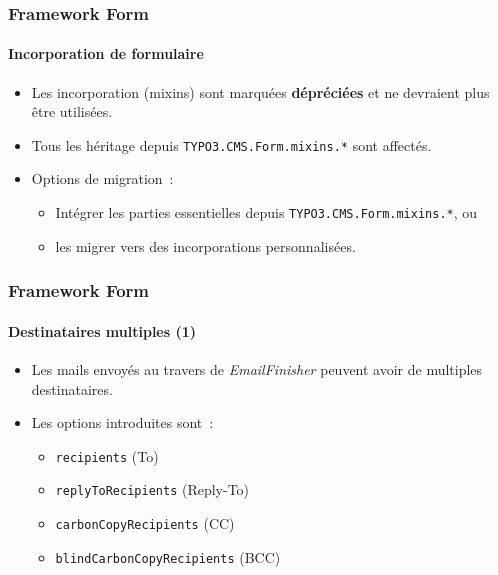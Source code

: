 
\begin{frame}[fragile]
	\frametitle{Framework Form}
	\framesubtitle{Incorporation de formulaire}

	\begin{itemize}
		\item Les incorporation (mixins) sont marquées \textbf{dépréciées} et ne devraient plus être utilisées.
		\item Tous les héritage depuis \texttt{TYPO3.CMS.Form.mixins.*} sont affectés.
		\item Options de migration~:

			\begin{itemize}
				\item Intégrer les parties essentielles depuis \texttt{TYPO3.CMS.Form.mixins.*}, ou
				\item les migrer vers des incorporations personnalisées.
			\end{itemize}

	\end{itemize}

\end{frame}


\begin{frame}[fragile]
	\frametitle{Framework Form}
	\framesubtitle{Destinataires multiples (1)}

	\begin{itemize}
		\item Les mails envoyés au travers de \textit{EmailFinisher} peuvent avoir de multiples destinataires.

		\item Les options introduites sont~:

			\begin{itemize}
				\item \texttt{recipients} (To)
				\item \texttt{replyToRecipients} (Reply-To)
				\item \texttt{carbonCopyRecipients} (CC)
				\item \texttt{blindCarbonCopyRecipients} (BCC)
			\end{itemize}

	\end{itemize}

\end{frame}

